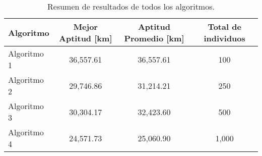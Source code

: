 \begin{table}[htbp]
\centering
\caption{Resumen de resultados de todos los algoritmos.}
\begin{tabular}{lccc}
\hline
\hline
Algoritmo & Mejor Aptitud {[}km{]} & Aptitud Promedio {[}km{]} & Total de individuos \\\hline
Algoritmo 1 & 36,557.61 & 36,557.61 & 100 \\
Algoritmo 2 & 29,746.86 & 31,214.21 & 250 \\
Algoritmo 3 & 30,304.17 & 32,423.60 & 500 \\
Algoritmo 4 & 24,571.73 & 25,060.90 & 1,000 \\\hline
\end{tabular}
\label{tab:RES}
\end{table}
